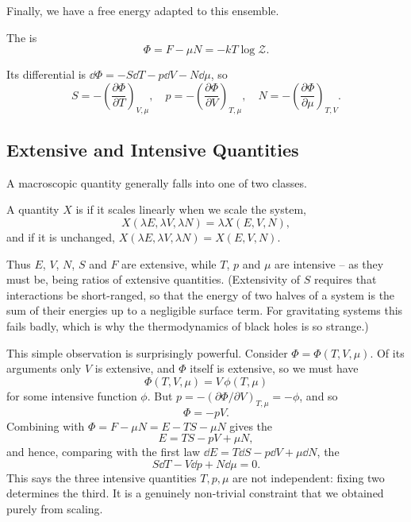 Finally, we have a free energy adapted to this ensemble.

\begin{definition}
	The  is
	$$
	\Phi = F - \mu N = -kT\log\mathcal Z.
	$$
\end{definition}

Its differential is $\dd\Phi = -S\dd T - p\dd V - N\dd\mu$, so
$$
S = -\left(\frac{\partial\Phi}{\partial T}\right)_{V,\mu},\quad p = -\left(\frac{\partial \Phi}{\partial V}\right)_{T,\mu}, \quad N = -\left(\frac{\partial\Phi}{\partial\mu}\right)_{T,V}.
$$

\subsection{Extensive and Intensive Quantities}

A macroscopic quantity generally falls into one of two classes.

\begin{definition}
	A quantity $X$ is  if it scales linearly when we scale the system,
	$$
	X(\lambda E, \lambda V, \lambda N) = \lambda X(E,V,N),
	$$
	and  if it is unchanged, $X(\lambda E, \lambda V, \lambda N) = X(E,V,N)$.
\end{definition}

Thus $E$, $V$, $N$, $S$ and $F$ are extensive, while $T$, $p$ and $\mu$ are intensive -- as they must be, being ratios of extensive quantities. (Extensivity of $S$ requires that interactions be short-ranged, so that the energy of two halves of a system is the sum of their energies up to a negligible surface term. For gravitating systems this fails badly, which is why the thermodynamics of black holes is so strange.)

This simple observation is surprisingly powerful. Consider $\Phi = \Phi(T,V,\mu)$. Of its arguments only $V$ is extensive, and $\Phi$ itself is extensive, so we must have
$$
\Phi(T,V,\mu) = V \, \phi(T,\mu)
$$
for some intensive function $\phi$. But $p = -(\partial \Phi/\partial V)_{T,\mu} = -\phi$, and so
$$
\Phi = -pV.
$$
Combining with $\Phi = F - \mu N = E - TS - \mu N$ gives the 
$$
E = TS - pV + \mu N,
$$
and hence, comparing with the first law $\dd E = T\dd S - p\dd V + \mu\dd N$, the 
$$
S\dd T - V \dd p + N\dd\mu = 0.
$$
This says the three intensive quantities $T, p, \mu$ are not independent: fixing two determines the third. It is a genuinely non-trivial constraint that we obtained purely from scaling.

